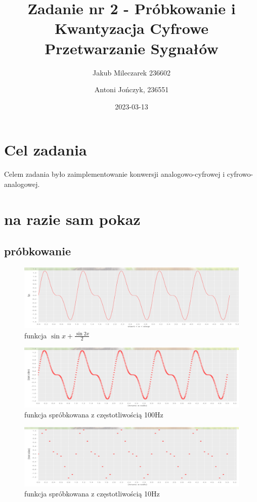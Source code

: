 \documentclass[12pt]{article}
\title{{\bf Zadanie nr 2 - Próbkowanie i Kwantyzacja}\linebreak
	Cyfrowe Przetwarzanie Sygnałów}
\author{Jakub Mileczarek 236602 \and Antoni Jończyk, 236551}
\date{2023-03-13} %
\begin{document}
\clearpage\maketitle
\thispagestyle{empty}
\newpage
\setcounter{page}{1}
\section{Cel zadania}
Celem zadania było zaimplementowanie konwersji analogowo-cyfrowej i
cyfrowo-analogowej.\cite{instrukcja2}
\section{na razie sam pokaz}
\subsection{próbkowanie}
\begin{figure}[H]
	\includegraphics[width=\linewidth]{2a.png}
	\caption{funkcja $\sin x +\frac{\sin 2x}{2}$}
\end{figure}

\begin{figure}[H]
	\includegraphics[width=\linewidth]{2a100.png}
	\caption{funkcja spróbkowana z częstotliwością 100Hz}
\end{figure}

\begin{figure}[H]
	\includegraphics[width=\linewidth]{2a10.png}
	\caption{funkcja spróbkowana z częstotliwością 10Hz}
	\label{only}
\end{figure}
\end{document}
